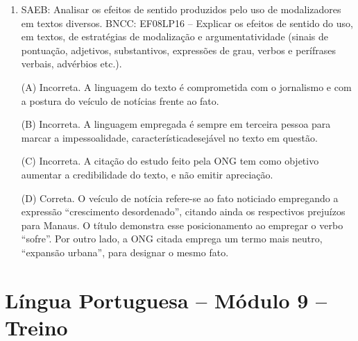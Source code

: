 \begin{enumerate}
(C) Incorreta. Embora a objetividade
seja uma característica desejável no texto em questão, a expressão
``crescimento desordenado'' revela certo grau de subjetividade por
trazer em si uma postura avaliativa do veículo de notícias em relação ao
fato. 

(D) Incorreta. Embora a imparcialidade seja uma característica
desejável no texto em questão, apenas uma das expressões, o termo
``expansão urbana'', traz um efeito semântico mais imparcial.

\item
SAEB: Analisar os efeitos de sentido produzidos pelo uso de
modalizadores em textos diversos. BNCC: EF08LP16 -- Explicar os efeitos
de sentido do uso, em textos, de estratégias de modalização e
argumentatividade (sinais de pontuação, adjetivos, substantivos,
expressões de grau, verbos e perífrases verbais, advérbios etc.).

(A) Incorreta. A linguagem do texto é comprometida com o jornalismo e
com a postura do veículo de notícias frente ao fato. 

(B) Incorreta. A
linguagem empregada é sempre em terceira pessoa para marcar a
impessoalidade, característicadesejável no texto em questão. 

(C)
Incorreta. A citação do estudo feito pela ONG tem como objetivo aumentar
a credibilidade do texto, e não emitir apreciação. 

(D) Correta. O
veículo de notícia refere-se ao fato noticiado empregando a expressão
``crescimento desordenado'', citando ainda os respectivos prejuízos para
Manaus. O título demonstra esse posicionamento ao empregar o verbo
``sofre''. Por outro lado, a ONG citada emprega um termo mais neutro,
``expansão urbana'', para designar o mesmo fato.
\end{enumerate}

\section*{Língua Portuguesa – Módulo 9 – Treino}

